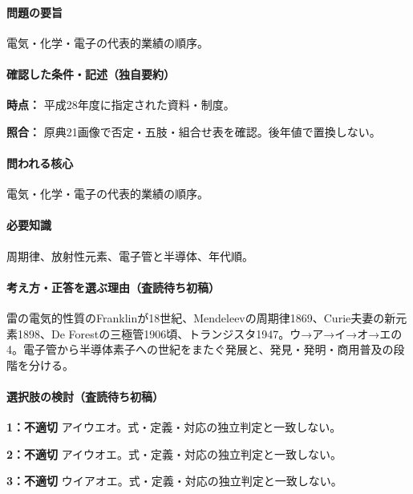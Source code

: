 \paragraph{問題の要旨} 電気・化学・電子の代表的業績の順序。

\paragraph{確認した条件・記述（独自要約）}\mbox{}\par

\noindent\textbf{時点：} 平成28年度に指定された資料・制度。\par

\noindent\textbf{照合：} 原典21画像で否定・五肢・組合せ表を確認。後年値で置換しない。\par

\paragraph{問われる核心} 電気・化学・電子の代表的業績の順序。

\paragraph{必要知識} 周期律、放射性元素、電子管と半導体、年代順。

\paragraph{考え方・正答を選ぶ理由（査読待ち初稿）} 雷の電気的性質のFranklinが18世紀、Mendeleevの周期律1869、Curie夫妻の新元素1898、De Forestの三極管1906頃、トランジスタ1947。ウ→ア→イ→オ→エの4。電子管から半導体素子への世紀をまたぐ発展と、発見・発明・商用普及の段階を分ける。

\paragraph{選択肢の検討（査読待ち初稿）}\mbox{}\par

\noindent\textbf{1：不適切} アイウエオ。式・定義・対応の独立判定と一致しない。\par

\noindent\textbf{2：不適切} アイウオエ。式・定義・対応の独立判定と一致しない。\par

\noindent\textbf{3：不適切} ウイアオエ。式・定義・対応の独立判定と一致しない。\par

